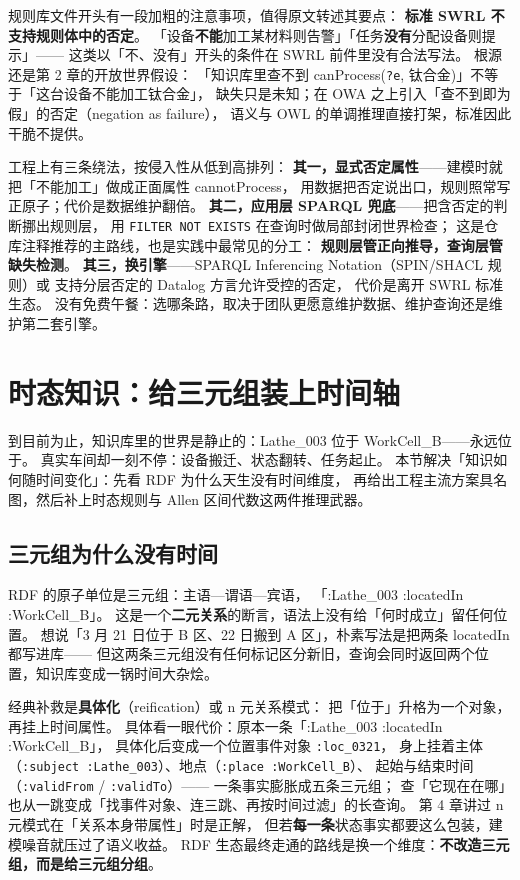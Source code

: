 规则库文件开头有一段加粗的注意事项，值得原文转述其要点：
\textbf{标准 SWRL 不支持规则体中的否定}。
「设备\textbf{不能}加工某材料则告警」「任务\textbf{没有}分配设备则提示」——
这类以「不、没有」开头的条件在 SWRL 前件里没有合法写法。
根源还是第 2 章的开放世界假设：
「知识库里查不到 canProcess(\texttt{?e}, 钛合金)」不等于「这台设备不能加工钛合金」，
缺失只是未知；在 OWA 之上引入「查不到即为假」的否定（negation as failure），
语义与 OWL 的单调推理直接打架，标准因此干脆不提供。

工程上有三条绕法，按侵入性从低到高排列：
\textbf{其一，显式否定属性}——建模时就把「不能加工」做成正面属性 cannotProcess，
用数据把否定说出口，规则照常写正原子；代价是数据维护翻倍。
\textbf{其二，应用层 SPARQL 兜底}——把含否定的判断挪出规则层，
用 \texttt{FILTER NOT EXISTS} 在查询时做局部封闭世界检查；
这是仓库注释推荐的主路线，也是实践中最常见的分工：
\textbf{规则层管正向推导，查询层管缺失检测}。
\textbf{其三，换引擎}——SPARQL Inferencing Notation（SPIN/SHACL 规则）或
支持分层否定的 Datalog 方言允许受控的否定，
代价是离开 SWRL 标准生态。
没有免费午餐：选哪条路，取决于团队更愿意维护数据、维护查询还是维护第二套引擎。

\section{时态知识：给三元组装上时间轴}

到目前为止，知识库里的世界是静止的：Lathe\_003 位于 WorkCell\_B——永远位于。
真实车间却一刻不停：设备搬迁、状态翻转、任务起止。
本节解决「知识如何随时间变化」：先看 RDF 为什么天生没有时间维度，
再给出工程主流方案具名图，然后补上时态规则与 Allen 区间代数这两件推理武器。

\subsection{三元组为什么没有时间}

RDF 的原子单位是三元组：主语—谓语—宾语，
「:Lathe\_003 :locatedIn :WorkCell\_B」。
这是一个\textbf{二元关系}的断言，语法上没有给「何时成立」留任何位置。
想说「3 月 21 日位于 B 区、22 日搬到 A 区」，朴素写法是把两条 locatedIn 都写进库——
但这两条三元组没有任何标记区分新旧，查询会同时返回两个位置，知识库变成一锅时间大杂烩。

经典补救是\textbf{具体化}（reification）或 n 元关系模式：
把「位于」升格为一个对象，再挂上时间属性。
具体看一眼代价：原本一条「:Lathe\_003 :locatedIn :WorkCell\_B」，
具体化后变成一个位置事件对象 \texttt{:loc\_0321}，
身上挂着主体（\texttt{:subject :Lathe\_003}）、地点（\texttt{:place :WorkCell\_B}）、
起始与结束时间（\texttt{:validFrom} / \texttt{:validTo}）——
一条事实膨胀成五条三元组；
查「它现在在哪」也从一跳变成「找事件对象、连三跳、再按时间过滤」的长查询。
第 4 章讲过 n 元模式在「关系本身带属性」时是正解，
但若\textbf{每一条}状态事实都要这么包装，建模噪音就压过了语义收益。
RDF 生态最终走通的路线是换一个维度：\textbf{不改造三元组，而是给三元组分组}。

